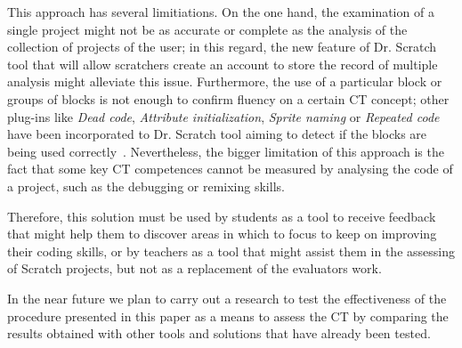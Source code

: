 \documentclass[a4paper,11pt]{article}
\begin{document}
This approach has several limitiations. On the one hand, the examination of a single project might not be as accurate or complete as the analysis of the collection of projects of the user; in this regard, the new feature of Dr. Scratch tool that will allow scratchers create an account to store the record of multiple analysis might alleviate this issue. Furthermore, the use of a particular block or groups of blocks is not enough to confirm fluency on a certain CT concept; other plug-ins like \textit{Dead code}, \textit{Attribute initialization}, \textit{Sprite naming} or \textit{Repeated code} have been incorporated to Dr. Scratch tool aiming to detect if the blocks are being used correctly~\cite{moreno2014automatic}. Nevertheless, the bigger limitation of this approach is the fact that some key CT competences cannot be measured by analysing the code of a project, such as the debugging or remixing skills. 

Therefore, this solution must be used by students as a tool to receive feedback that might help them to discover areas in which to focus to keep on improving their coding skills, or by teachers as a tool that might assist them in the assessing of Scratch projects, but not as a replacement of the evaluators work.

In the near future we plan to carry out a research to test the effectiveness of the procedure presented in this paper as a means to assess the CT by comparing the results obtained with other tools and solutions that have already been tested.
\newpage


\end{document}
